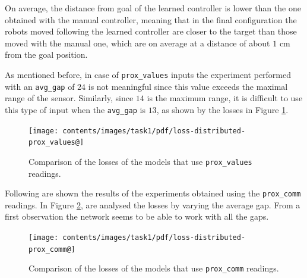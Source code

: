 On average, the distance from goal of the learned controller is lower than the one 
obtained with the manual controller, meaning that in the final configuration 
the robots moved following the learned controller are closer to the target than 
those moved with the manual one, which are on average at a distance of about 
$1$ \gls{cm} from the goal position. 

As mentioned before, in case of \texttt{prox\_values} inputs the 
experiment performed with an \texttt{avg\_gap} of $24$ is not meaningful since 
this value exceeds the maximal range of the sensor. Similarly, since $14$ is the 
maximum range, it is difficult to use this type of input when the \texttt{avg\_gap}  
is $13$, as shown by the losses in Figure \ref{fig:distlossprox_values}.
\begin{figure}[!htb]
	\centering
	\texttt{[image: contents/images/task1/pdf/loss-distributed-prox\_values@]}%
	\caption{Comparison of the losses of the models that use \texttt{prox\_values} 
		readings.}
	\label{fig:distlossprox_values}
\end{figure}

Following are shown the results of the experiments obtained using the 
\texttt{prox\_comm} readings. In Figure \ref{fig:distlossprox_comm}, are 
analysed the losses by varying the average gap. From a first observation the 
network seems to be able to work with all the gaps.
\begin{figure}[!htb]
	\centering
	\texttt{[image: contents/images/task1/pdf/loss-distributed-prox\_comm@]}%
	\caption{Comparison of the losses of the models that use \texttt{prox\_comm} 
	readings.}
	\label{fig:distlossprox_comm}
\end{figure}

